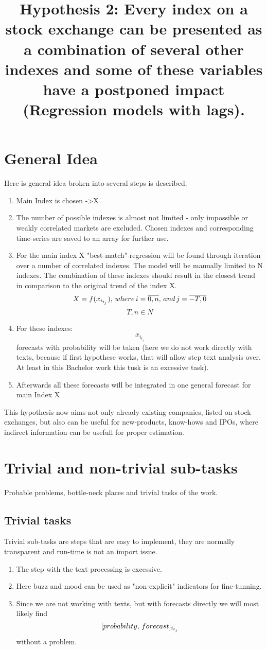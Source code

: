 \documentclass{article}
\title{Hypothesis 2: Every index on a stock exchange can be presented as a combination of several other indexes and some of these variables have a postponed impact (Regression models with lags).}
\begin{document}
\maketitle

\section{General Idea}
Here is general idea broken into several steps is described.
\begin{enumerate}
	\item Main Index is chosen -\textgreater X
	\item The number of possible indexes is almost not limited - only impossible or weakly correlated markets are excluded. Chosen indexes and corresponding time-series are saved to an array for further use.
	\item For the main index X "best-match"-regression will be found through iteration over a number of correlated indexes. The model will be manually limited to N indexes. The combination of these indexes should result in the closest trend in comparison to the original trend of the index X. \\
	\[X = f(x_{i_{t_{j}}}),\thinspace where \thinspace i=\overline{0,n},\thinspace and \thinspace j=\overline{-T,0} \]
	\[T, n \in N \]    
	\item For these indexes: \[x_{i_{t_{j}}}\] forecasts with probability will be taken (here we do not work directly with texts, because if first hypothese works, that will allow step text analysis over. At least in this Bachelor work this tusk is an excessive task).
	\item Afterwards all these forecasts will be integrated in one general forecast for main Index X
\end{enumerate}
This hypothesis now aims not only already existing companies, listed on stock exchanges, but also can be useful for new-products, know-hows and IPOs, where indirect information can be usefull for proper estimation.


\newpage
\section{Trivial and non-trivial sub-tasks}
Probable problems, bottle-neck places and trivial tasks of the work.
\subsection{Trivial tasks}
Trivial sub-tasks are steps that are easy to implement, they are normally transparent and run-time is not an import issue.
\begin{enumerate}
	\item The step with the text processing is excessive.
	\item Here buzz and mood can be used as "non-explicit" indicators for fine-tunning.
	\item Since we are not working with texts, but with forecasts directly we will most likely find \[[probability,\thinspace forecast]_{i_{t_{j}}}\] without a problem.
	
\end{enumerate}  
\end{document}
